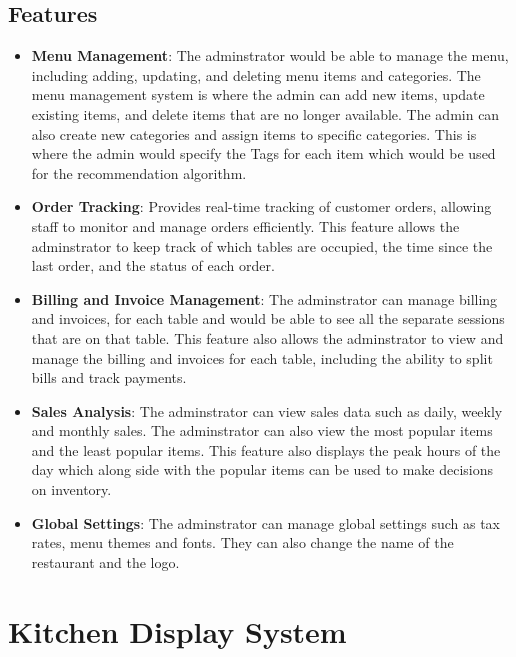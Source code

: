 \subsection{Features}
\begin{itemize}
    \item \textbf{Menu Management}: The adminstrator would be able to manage the menu, including adding, updating, and deleting menu items and categories. The menu management system is where the admin can add new items, update existing items, and delete items that are no longer available. The admin can also create new categories and assign items to specific categories. This is where the admin would specify the Tags for each item which would be used for the recommendation algorithm.
    \item \textbf{Order Tracking}: Provides real-time tracking of customer orders, allowing staff to monitor and manage orders efficiently. This feature allows the adminstrator to keep track of which tables are occupied, the time since the last order, and the status of each order.
    \item \textbf{Billing and Invoice Management}: The adminstrator can manage billing and invoices, for each table and would be able to see all the separate sessions that are on that table. This feature also allows the adminstrator to view and manage the billing and invoices for each table, including the ability to split bills and track payments.
    \item \textbf{Sales Analysis}: The adminstrator can view sales data such as daily, weekly and monthly sales. The adminstrator can also view the most popular items and the least popular items. This feature also displays the peak hours of the day which along side with the popular items can be used to make decisions on inventory.
    \item \textbf{Global Settings}: The adminstrator can manage global settings such as tax rates, menu themes and fonts. They can also change the name of the restaurant and the logo.
\end{itemize}

\section{Kitchen Display System}
